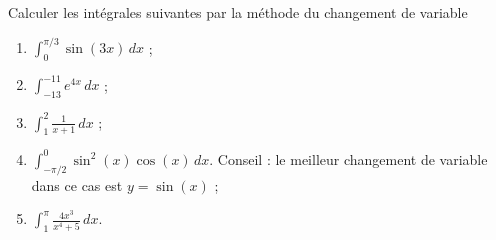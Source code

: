 \begin{exercice}\label{exoTD5-00002}

Calculer les intégrales suivantes par la méthode du changement de variable 
\begin{enumerate}
\item $\displaystyle \int_0^{\pi/3} \sin(3x)\, dx $ ;
  \item $\displaystyle \int_{-13}^{-11} e^{4x}\, dx $ ;
    \item $\displaystyle \int_1^2 \frac{1}{x+1}\, dx $ ;
      \item $\displaystyle \int_{-\pi/2}^{0} \sin^2(x)\cos(x) \, dx $. Conseil : le meilleur changement de variable dans ce cas est $y=\sin(x)$ ;
        \item $\displaystyle \int_{1}^{\pi} \frac{4x^3}{x^4+5}\, dx$.
\end{enumerate}
  
\end{exercice}
